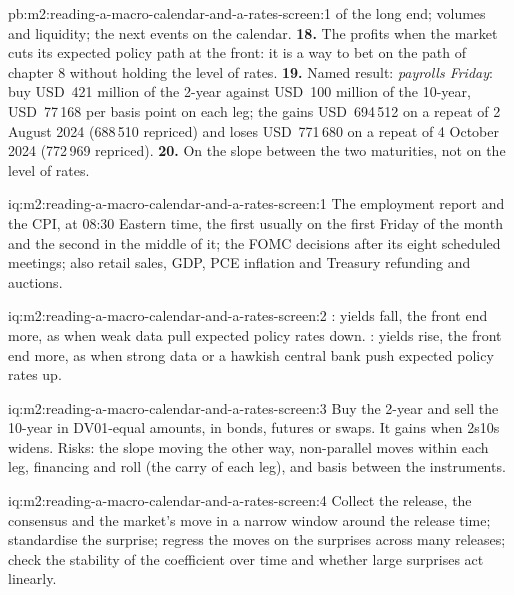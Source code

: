 \begin{solution}{pb:m2:reading-a-macro-calendar-and-a-rates-screen:1}
of the long end; volumes and liquidity; the next events on the calendar.
\textbf{18.} The  profits when the market cuts its expected policy path at the
front: it is a way to bet on the path of chapter 8 without holding the level of rates.
\textbf{19.} Named result: \emph{payrolls Friday}: buy USD~421 million of the 2-year
against USD~100 million of the 10-year, USD~77\,168 per basis point on each leg; the
 gains USD~694\,512 on a repeat of 2 August 2024 (688\,510 repriced) and loses
USD~771\,680 on a repeat of 4 October 2024 (772\,969 repriced).
\textbf{20.} On the slope between the two maturities, not on the level of rates.
\end{solution}

\begin{solution}{iq:m2:reading-a-macro-calendar-and-a-rates-screen:1}
The employment report and the CPI, at 08:30 Eastern time, the first usually on the first
Friday of the month and the second in the middle of it; the FOMC decisions after its eight
scheduled meetings; also retail sales, GDP, PCE inflation and Treasury refunding and
auctions.
\end{solution}

\begin{solution}{iq:m2:reading-a-macro-calendar-and-a-rates-screen:2}
: yields fall, the front end more, as when weak data pull expected policy
rates down. : yields rise, the front end more, as when strong data or a
hawkish central bank push expected policy rates up.
\end{solution}

\begin{solution}{iq:m2:reading-a-macro-calendar-and-a-rates-screen:3}
Buy the 2-year and sell the 10-year in DV01-equal amounts, in bonds, futures or swaps. It
gains when 2s10s widens. Risks: the slope moving the other way, non-parallel moves within
each leg, financing and roll (the carry of each leg), and basis between the instruments.
\end{solution}

\begin{solution}{iq:m2:reading-a-macro-calendar-and-a-rates-screen:4}
Collect the release, the consensus and the market's move in a narrow window around the
release time; standardise the surprise; regress the moves on the surprises across many
releases; check the stability of the coefficient over time and whether large surprises
act linearly.
\end{solution}

